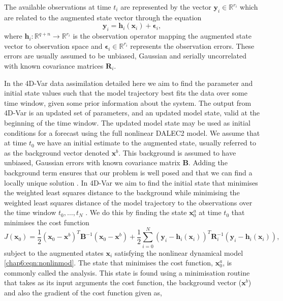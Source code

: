 The available observations at time $t_{i}$ are represented by the vector $\textbf{y}_{i} \in \mathbb{R}^{r_{i}}$ which are related to the augmented state vector through the equation
\begin{equation}
\textbf{y}_{i}=\textbf{h}_{i}(\textbf{x}_{i})+ \mathbf{ \epsilon}_{i},
\end{equation} 
where $\textbf{h}_{i}: \mathbb{R}^{q+n} \rightarrow \mathbb{R}^{r_{i}}$ is the observation operator mapping the augmented state vector to observation space and $\mathbf{\epsilon}_{i} \in \mathbb{R}^{r_{i}}$ represents the observation errors. These errors are usually assumed to be unbiased, Gaussian and serially uncorrelated with known covariance matrices $\textbf{R}_{i}$.

In the 4D-Var data assimilation detailed here we aim to find the parameter and initial state values such that the model trajectory best fits the data over some time window, given some prior information about the system. The output from 4D-Var is an updated set of parameters, and an updated model state, valid at the beginning of the time window. The updated model state may be used as initial conditions for a forecast using the full nonlinear DALEC2 model. We assume that at time $t_{0}$ we have an initial estimate to the augmented state, usually referred to as the background vector denoted $\textbf{x}^{b}$. This background is assumed to have unbiased, Gaussian errors with known covariance matrix $\textbf{B}$. Adding the background term ensures that our problem is well posed and that we can find a locally unique solution \citep{Tremolet2006}. In 4D-Var we aim to find the initial state that minimises the weighted least squares distance to the background while minimising the weighted least squares distance of the model trajectory to the observations over the time window $t_{0}, \dots, t_{N}$ \citep{lawless2013}. We do this by finding the state $\textbf{x}^{a}_{0}$ at time $t_{0}$ that minimises the cost function
\begin{equation}
J(\textbf{x}_0) = \frac{1}{2}(\textbf{x}_0-\textbf{x}^b)^{T}\textbf{B}^{-1}(\textbf{x}_0-\textbf{x}^b)+\frac{1}{2}\sum_{i=0}^{N}(\textbf{y}_i-\textbf{h}_i(\textbf{x}_i))^{T}\textbf{R}_{i}^{-1}(\textbf{y}_i-\textbf{h}_i(\textbf{x}_i)),
\end{equation}
subject to the augmented states $\textbf{x}_{i}$ satisfying the nonlinear dynamical model \eqref{chap6:eqn:nonlinmod}. The state that minimises the cost function, $\textbf{x}^{a}_{0}$, is commonly called the analysis. This state is found using a minimisation routine that takes as its input arguments the cost function, the background vector ($\textbf{x}^{b}$) and also the gradient of the cost function given as,
